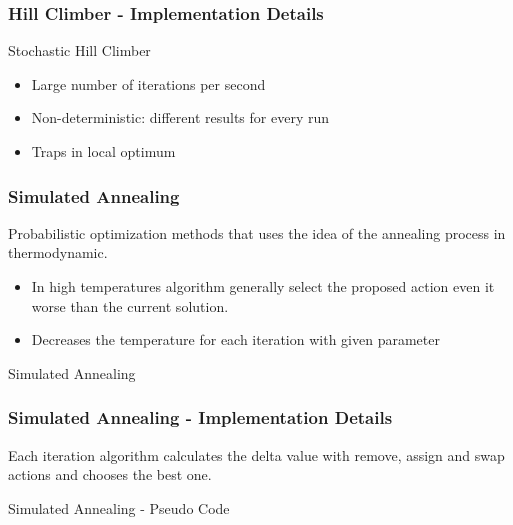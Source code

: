 \documentclass{beamer}
\makeatletter
\newenvironment{algorithm}[1][]{%
  \def\@captype{algorithm}%
  \par\nobreak\begin{center}\nobreak}
  {\par\nobreak\end{center}\nobreak}
\newcounter{algorithm}
\makeatother
\begin{document}
\begin{frame}
\frametitle{Hill Climber - Implementation Details}
Stochastic Hill Climber
\begin{itemize}
\item Large number of iterations per second
\item Non-deterministic: different results for every run
\item Traps in local optimum
\end{itemize}
\end{frame}

\begin{frame}[shrink=20]
\frametitle {Simulated Annealing}
Probabilistic optimization methods that uses the idea of the annealing process in thermodynamic.
\begin{itemize}
\item In high temperatures algorithm generally select the proposed action even it worse than the current solution.
\item Decreases the temperature for each iteration with given parameter
\end{itemize}

\begin{algorithm}[H]
\begin{algorithmic}[1]
\REPEAT
{}
\ENDIF
{}
\end{algorithmic}
\caption{Simulated Annealing }
\label{alg:seq}
\end{algorithm}
\end{frame}

\begin{frame}[shrink=20]
\frametitle{Simulated Annealing  - Implementation Details}
Each iteration algorithm calculates the delta value with remove, assign and swap actions and chooses the best one. 
\begin{algorithm}[H]
\begin{algorithmic}[1]
\REPEAT
\REPEAT
{}
\ENDIF
{}
\end{algorithmic}
\caption{Simulated Annealing - Pseudo Code}
\label{alg:seq}
\end{algorithm}
\end{frame}
\end{document}
